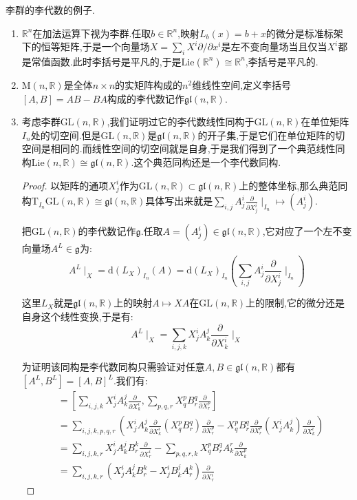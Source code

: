 李群的李代数的例子.
\begin{enumerate}
	\item $\mathbb{R}^n$在加法运算下视为李群.任取$b\in\mathbb{R}^n$,映射$L_b(x)=b+x$的微分是标准标架下的恒等矩阵,于是一个向量场$X=\sum_iX^i\partial/\partial x^i$是左不变向量场当且仅当$X^i$都是常值函数.此时李括号是平凡的,于是$\mathrm{Lie}(\mathbb{R}^n)\cong\mathbb{R}^n$,李括号是平凡的.
	\item $\mathrm{M}(n,\mathbb{R})$是全体$n\times n$的实矩阵构成的$n^2$维线性空间,定义李括号$[A,B]=AB-BA$构成的李代数记作$\mathfrak{gl}(n,\mathbb{R})$.
	\item 考虑李群$\mathrm{GL}(n,\mathbb{R})$,我们证明过它的李代数线性同构于$\mathrm{GL}(n,\mathbb{R})$在单位矩阵$I_n$处的切空间.但是$\mathrm{GL}(n,\mathbb{R})$是$\mathfrak{gl}(n,\mathbb{R})$的开子集,于是它们在单位矩阵的切空间是相同的.而线性空间的切空间就是自身,于是我们得到了一个典范线性同构$\mathrm{Lie}(n,\mathbb{R})\cong\mathfrak{gl}(n,\mathbb{R})$.这个典范同构还是一个李代数同构.
	\begin{proof}
		
		以矩阵的通项$X_j^i$作为$\mathrm{GL}(n,\mathbb{R})\subset\mathfrak{gl}(n,\mathbb{R})$上的整体坐标,那么典范同构$\mathrm{T}_{I_n}\mathrm{GL}(n,\mathbb{R})\cong\mathfrak{gl}(n,\mathbb{R})$具体写出来就是$\sum_{i,j}A_j^i\frac{\partial}{\partial X_j^i}\mid_{I_n}\mapsto(A_j^i)$.
		
		把$\mathrm{GL}(n,\mathbb{R})$的李代数记作$\mathfrak{g}$.任取$A=(A_j^i)\in\mathfrak{gl}(n,\mathbb{R})$,它对应了一个左不变向量场$A^L\in\mathfrak{g}$为:
		$$A^L\mid_X=\mathrm{d}(L_X)_{I_n}(A)=\mathrm{d}(L_X)_{I_n}\left(\sum_{i,j}A_j^i\frac{\partial}{\partial X_j^i}\mid_{I_n}\right)$$
		
		这里$L_X$就是$\mathfrak{gl}(n,\mathbb{R})$上的映射$A\mapsto XA$在$\mathrm{GL}(n,\mathbb{R})$上的限制,它的微分还是自身这个线性变换,于是有:
		$$A^L\mid_X=\sum_{i,j,k}X_j^iA_k^j\frac{\partial}{\partial X_k^i}\mid_X$$
		
		为证明该同构是李代数同构只需验证对任意$A,B\in\mathfrak{gl}(n,\mathbb{R})$都有$[A^L,B^L]=[A,B]^L$.我们有:
		\begin{align*}
		[A^L,B^L]&=[\sum_{i,j,k}X_j^iA_k^j\frac{\partial}{\partial X_k^i},\sum_{p,q,r}X_q^pB_r^q\frac{\partial}{\partial X_r^p}]\\&=\sum_{i,j,k,p,q,r}\left(X_j^iA_k^j\frac{\partial}{\partial X_k^i}(X_q^pB_r^q)\frac{\partial}{\partial X_r^p}-X_q^pB_r^q\frac{\partial}{\partial X_r^p}(X_j^iA_k^j)\frac{\partial}{\partial X_k^i}\right)\\&=\sum_{i,j,k,r}X_j^iA_k^jB_r^k\frac{\partial}{\partial X_r^i}-\sum_{p,q,r,k}X_q^pB_r^qA_k^r\frac{\partial}{\partial X_k^p}\\&=\sum_{i,j,k,r}\left(X_j^iA_k^jB_r^k-X_j^iB_k^jA_r^k\right)\frac{\partial}{\partial X_r^i}
		\end{align*}
		

\end{proof}
\end{enumerate}
